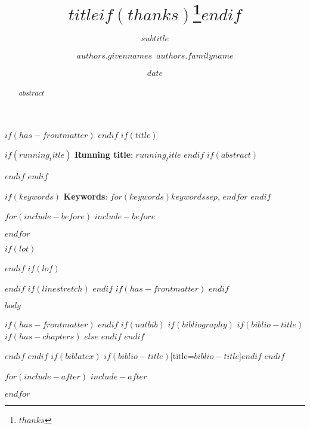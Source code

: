 \documentclass[11pt]{article}
\title{$title$$if(thanks)$\thanks{$thanks$}$endif$}
\subtitle{$subtitle$}
\author[$for(authors.affiliations)$$authors.affiliations$$sep$,$endfor$]{$authors.givennames$~$authors.familyname$}
\affil[$affiliations.index$]{$affiliations.name$}
\date{$date$}
\begin{document}
$if(has-frontmatter)$
\frontmatter
$endif$
$if(title)$
\maketitle
$if(running_title)$
\hspace{1cm}\small{{\bf Running title}: $running_title$}
$endif$
$if(abstract)$
\begin{abstract}
$abstract$
\end{abstract}
$endif$
$endif$

$if(keywords)$
\hspace{1cm}\small{{\bf Keywords}: $for(keywords)$$keywords$$sep$, $endfor$}
$endif$

$for(include-before)$
$include-before$

$endfor$

$if(lot)$
\listoftables
$endif$
$if(lof)$
\listoffigures
$endif$
$if(linestretch)$
$endif$
$if(has-frontmatter)$
\mainmatter
$endif$

\linenumbers

$body$

$if(has-frontmatter)$
\backmatter
$endif$
$if(natbib)$
$if(bibliography)$
$if(biblio-title)$
$if(has-chapters)$
\renewcommand\bibname{$biblio-title$}
$else$
\renewcommand\refname{$biblio-title$}
$endif$
$endif$


$endif$
$endif$
$if(biblatex)$
\printbibliography$if(biblio-title)$[title=$biblio-title$]$endif$
$endif$

$for(include-after)$
$include-after$

$endfor$
\end{document}
